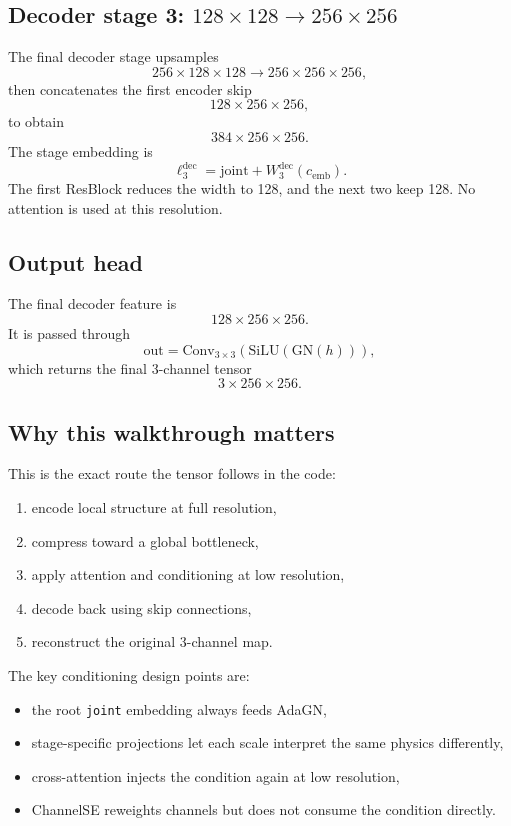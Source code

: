 \documentclass[11pt]{article}
\begin{document}
\subsection{Decoder stage 3: $128 \times 128 \to 256 \times 256$}
The final decoder stage upsamples
\[
256 \times 128 \times 128 \to 256 \times 256 \times 256,
\]
then concatenates the first encoder skip
\[
128 \times 256 \times 256,
\]
to obtain
\[
384 \times 256 \times 256.
\]
The stage embedding is
\[
\ell^{\mathrm{dec}}_3 = \mathrm{joint} + W^{\mathrm{dec}}_3(c_{\mathrm{emb}}).
\]
The first ResBlock reduces the width to 128, and the next two keep 128.
No attention is used at this resolution.

\subsection{Output head}
The final decoder feature is
\[
128 \times 256 \times 256.
\]
It is passed through
\[
\mathrm{out} = \mathrm{Conv}_{3 \times 3}(\mathrm{SiLU}(\mathrm{GN}(h))),
\]
which returns the final 3-channel tensor
\[
3 \times 256 \times 256.
\]

\subsection{Why this walkthrough matters}
This is the exact route the tensor follows in the code:
\begin{enumerate}
  \item encode local structure at full resolution,
  \item compress toward a global bottleneck,
  \item apply attention and conditioning at low resolution,
  \item decode back using skip connections,
  \item reconstruct the original 3-channel map.
\end{enumerate}

The key conditioning design points are:
\begin{itemize}
  \item the root \texttt{joint} embedding always feeds AdaGN,
  \item stage-specific projections let each scale interpret the same physics differently,
  \item cross-attention injects the condition again at low resolution,
  \item ChannelSE reweights channels but does not consume the condition directly.
\end{itemize}
\end{document}
